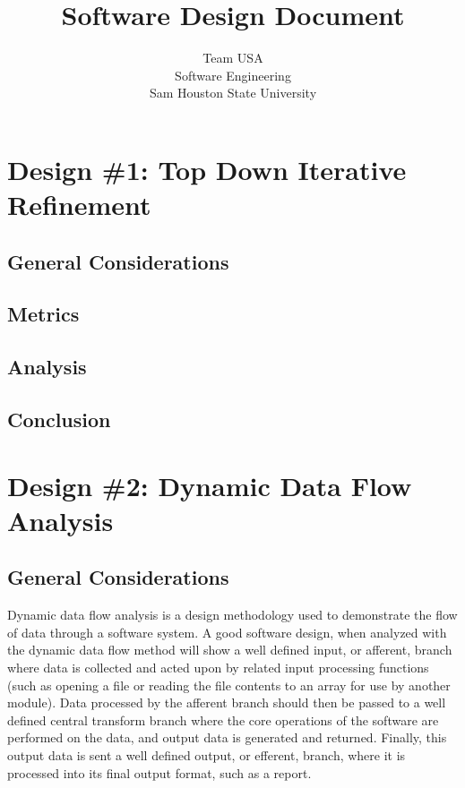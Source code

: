 \documentclass{article}
\title{Software Design Document}
\author{Team USA \\ Software Engineering \\ Sam Houston State University}
\begin{document}
\maketitle
\newpage

\tableofcontents
\newpage

%
\section{Design \#1: Top Down Iterative Refinement}
	\subsection{General Considerations}
	\subsection{Metrics}
	\subsection{Analysis}
	\subsection{Conclusion}
%
%
\section{Design \#2: Dynamic Data Flow Analysis}
	\subsection{General Considerations}
		Dynamic data flow analysis is a design methodology used to demonstrate the flow of data through a software system. A good software design, when analyzed with the dynamic data flow method will show a well defined input, or afferent, branch where data is collected and acted upon by related input processing functions (such as opening a file or reading the file contents to an array for use by another module). Data processed by the afferent branch should then be passed to a well defined central transform branch where the core operations of the software are performed on the data, and output data is generated and returned. Finally, this output data is sent a well defined output, or efferent, branch, where it is processed into its final output format, such as a report. 
	
\end{document}
